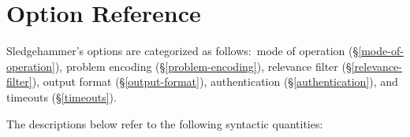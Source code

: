 \documentclass[a4paper,12pt]{article}
\def\qtybf#1{$\mathbf{\left<\textbf{\textit{#1\/}}\right>}$}
\begin{document}
\section{Option Reference}
\label{option-reference}

\def\defl{\{}
\def\defr{\}}

\def\flushitem#1{\item[]\noindent\kern-\leftmargin \textbf{#1}}
\def\optrue#1#2{\flushitem{\textit{#1} $\bigl[$= \qtybf{bool}$\bigr]$\enskip \defl\textit{true}\defr\hfill (neg.: \textit{#2})}\nopagebreak\\[\parskip]}
\def\opfalse#1#2{\flushitem{\textit{#1} $\bigl[$= \qtybf{bool}$\bigr]$\enskip \defl\textit{false}\defr\hfill (neg.: \textit{#2})}\nopagebreak\\[\parskip]}
\def\opsmart#1#2{\flushitem{\textit{#1} $\bigl[$= \qtybf{smart\_bool}$\bigr]$\enskip \defl\textit{smart}\defr\hfill (neg.: \textit{#2})}\nopagebreak\\[\parskip]}
\def\opnodefault#1#2{\flushitem{\textit{#1} = \qtybf{#2}} \nopagebreak\\[\parskip]}
\def\opnodefaultbrk#1#2{\flushitem{$\bigl[$\textit{#1} =$\bigr]$ \qtybf{#2}} \nopagebreak\\[\parskip]}
\def\opdefault#1#2#3{\flushitem{\textit{#1} = \qtybf{#2}\enskip \defl\textit{#3}\defr} \nopagebreak\\[\parskip]}
\def\oparg#1#2#3{\flushitem{\textit{#1} \qtybf{#2} = \qtybf{#3}} \nopagebreak\\[\parskip]}
\def\opargbool#1#2#3{\flushitem{\textit{#1} \qtybf{#2} $\bigl[$= \qtybf{bool}$\bigr]$\hfill (neg.: \textit{#3})}\nopagebreak\\[\parskip]}
\def\opargboolorsmart#1#2#3{\flushitem{\textit{#1} \qtybf{#2} $\bigl[$= \qtybf{smart\_bool}$\bigr]$\hfill (neg.: \textit{#3})}\nopagebreak\\[\parskip]}

Sledgehammer's options are categorized as follows:\ mode of operation
(\S\ref{mode-of-operation}), problem encoding (\S\ref{problem-encoding}),
relevance filter (\S\ref{relevance-filter}), output format
(\S\ref{output-format}), authentication (\S\ref{authentication}), and timeouts
(\S\ref{timeouts}).

The descriptions below refer to the following syntactic quantities:
\end{document}
